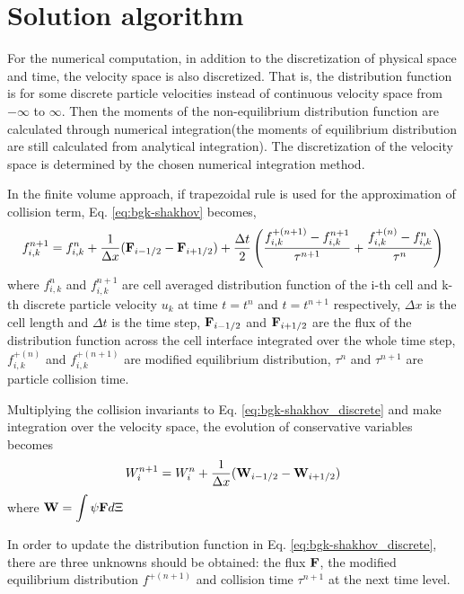 \documentclass[a4paper]{book}
\begin{document}
\section{Solution algorithm}
For the numerical computation, in addition to the discretization of physical space and time, the velocity space is also discretized. That is, the distribution function is for some discrete particle velocities instead of continuous velocity space from $-\infty$ to $\infty$. Then the moments of the non-equilibrium distribution function are calculated through numerical integration(the moments of equilibrium distribution are still calculated from analytical integration). The discretization of the velocity space is determined by the chosen numerical integration method.

In the finite volume approach, if trapezoidal rule is used for the approximation of collision term, Eq. \ref{eq:bgk-shakhov} becomes,
\begin{equation} 
    \label{eq:bgk-shakhov_discrete}
    f_{i,k}^{n+1} = f_{i,k}^n+\frac{1}{\Delta x}({\bf F}_{i-1/2}-{\bf F}_{i+1/2})+\frac{\Delta t}{2}\left(\frac{f_{i,k}^{+(n+1)}-f_{i,k}^{n+1}}{\tau^{n+1}}+\frac{f_{i,k}^{+(n)}-f_{i,k}^n}{\tau^n}\right)
\end{equation}
where $f_{i,k}^n$ and $f_{i,k}^{n+1}$ are cell averaged distribution function of the i-th cell and k-th discrete particle velocity $u_k$ at time $t=t^n$ and $t=t^{n+1}$ respectively, $\Delta x$ is the cell length and $\Delta t$ is the time step, ${\bf F}_{i-1/2}$ and ${\bf F}_{i+1/2}$ are the flux of the distribution function across the cell interface integrated over the whole time step, $f_{i,k}^{+(n)}$ and $f_{i,k}^{+(n+1)}$ are modified equilibrium distribution, $\tau^n$ and $\tau^{n+1}$ are particle collision time.

Multiplying the collision invariants to Eq. \ref{eq:bgk-shakhov_discrete} and make integration over the velocity space, the evolution of conservative variables becomes
\begin{equation} 
    \label{eq:conservative_discrete}
    W_i^{n+1} = W_i^n+\frac{1}{\Delta x}({\bf W}_{i-1/2}-{\bf W}_{i+1/2})
\end{equation}
where $\displaystyle{\bf W} = \int\psi{\bf F}d\Xi$

In order to update the distribution function in Eq. \ref{eq:bgk-shakhov_discrete}, there are three unknowns should be obtained: the flux ${\bf F}$, the modified equilibrium distribution $f^{+(n+1)}$ and collision time $\tau^{n+1}$ at the next time level.
\end{document}
